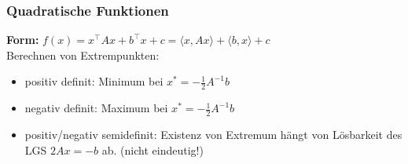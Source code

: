 \documentclass[6pt,a4paper]{scrartcl}
\begin{document}
\begin{multicols*}{4}
\subsubsection{Quadratische Funktionen}
\textbf{Form:} $f(x)=x^{\top}Ax+b^{\top}x+c = \langle x,Ax \rangle + \langle b,x \rangle + c$\\
Berechnen von Extrempunkten:
\begin{itemize}\itemsep0pt
\item positiv definit: Minimum bei $x^{*}=-\frac{1}{2}A^{-1}b$
\item negativ definit: Maximum bei $x^{*}=-\frac{1}{2}A^{-1}b$
\item positiv/negativ semidefinit: Existenz von Extremum hängt von Lösbarkeit des LGS $2Ax=-b$ ab. (nicht eindeutig!)
\end{itemize}

\end{multicols*}


\end{document}
